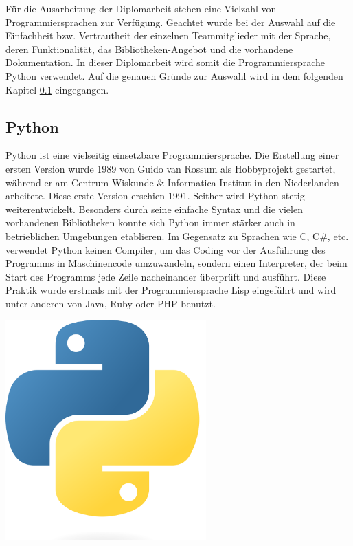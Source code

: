 Für die Ausarbeitung der Diplomarbeit stehen eine Vielzahl von Programmiersprachen zur Verfügung. Geachtet wurde bei der Auswahl auf die Einfachheit bzw. Vertrautheit der einzelnen Teammitglieder mit der Sprache, deren Funktionalität, das Bibliotheken-Angebot und die vorhandene Dokumentation. In dieser Diplomarbeit wird somit die Programmiersprache Python verwendet. Auf die genauen Gründe zur Auswahl wird in dem folgenden Kapitel \ref{python_kapitel} eingegangen.

\subsection{Python}\label{python_kapitel}
\begin{minipage}{0.6\textwidth}
	Python ist eine vielseitig einsetzbare Programmiersprache. Die Erstellung einer ersten Version wurde 1989 von Guido van Rossum als Hobbyprojekt gestartet, während er am Centrum Wiskunde \& Informatica Institut in den Niederlanden arbeitete. Diese erste Version erschien 1991. Seither wird Python stetig weiterentwickelt. Besonders durch seine einfache Syntax und die vielen vorhandenen Bibliotheken konnte sich Python immer stärker auch in betrieblichen Umgebungen etablieren. Im Gegensatz zu Sprachen wie C, C\#, etc. verwendet Python keinen Compiler, um das Coding vor der Ausführung des Programms in Maschinencode umzuwandeln, sondern einen Interpreter, der beim Start des Programms jede Zeile nacheinander überprüft und ausführt. Diese Praktik wurde erstmals mit der Programmiersprache Lisp eingeführt und wird unter anderen von Java, Ruby oder PHP benutzt. 
	\cite{Python_Software_Foundation:o.J., Pramanick_gfg:2019, Ryte:2021}
\end{minipage}%
\hfill
\begin{minipage}{0.37\textwidth}
	\centering	
	\includegraphics[width=0.58\textwidth]{Bilder/Python_logo}
\end{minipage}
\vspace{1ex}

